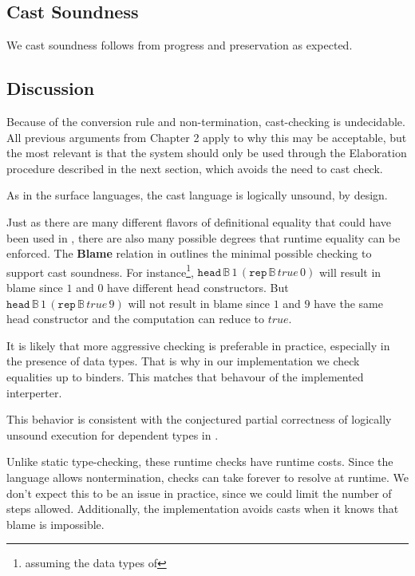 \subsection{Cast Soundness}


We cast soundness follows from progress and preservation as expected.


\subsection{Discussion}



Because of the conversion rule and non-termination, cast-checking is undecidable.
All previous arguments from Chapter 2 apply to why this may be acceptable, but the most relevant is that the system should only be used through the Elaboration procedure described in the next section, which avoids the need to cast check.


As in the surface languages, the cast language is logically unsound, by design.

Just as there are many different flavors of definitional equality that could have been used in , there are also many possible degrees that runtime equality can be enforced.
The \textbf{Blame} relation in  outlines the minimal possible checking to support cast soundness.
For instance\footnote{assuming the data types of }, $\mathtt{head}\,\mathbb{B}\,1\,\left(\mathtt{rep}\,\mathbb{B}\,true\,0\right)$ will result in blame since $1$ and $0$ have different head constructors.
But $\mathtt{head}\,\mathbb{B}\,1\,\left(\mathtt{rep}\,\mathbb{B}\,true\,9\right)$ will not result in blame since $1$ and $9$ have the same head constructor and the computation can reduce to $true$. 

It is likely that more aggressive checking is preferable in practice, especially in the presence of data types.
That is why in our implementation we check equalities up to binders.
This matches that \cbv{} behavour of the implemented interperter. 

This behavior is consistent with the conjectured partial correctness of logically unsound \cbv{} execution for dependent types in \cite{jia2010dependent}. 


Unlike static type-checking, these runtime checks have runtime costs.
Since the language allows nontermination, checks can take forever to resolve at runtime.
We don't expect this to be an issue in practice, since we could limit the number of steps allowed.
Additionally, the implementation avoids casts when it knows that blame is impossible.